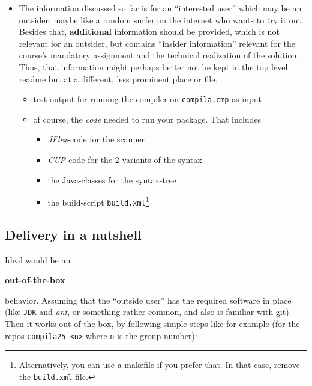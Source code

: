\documentclass[10pt,freeform]{handout}[2014/08/13]
\begin{document}
\begin{itemize}
\item The information discussed so far is for an ``interested user'' which
  may be an outsider, maybe like a random surfer on the internet who wants
  to try it out. Besides that, \textbf{additional} information should be
  provided, which is not relevant for an outsider, but contains ``insider
  information'' relevant for the course's mandatory assignment and the
  technical realization of the solution. Thus, that information might
  perhaps better not be kept in the top level readme but at a different,
  less prominent place or file.
  \begin{itemize}
  \item test-output for running the compiler on \texttt{compila.cmp} as
    input
  \item of course, the \emph{code} needed to run your package. That
    includes
    \begin{itemize}
    \item \textsl{JFlex}-code for the scanner
    \item \textsl{CUP}-code for the 2 variants of the syntax
    \item the Java-classes for the syntax-tree
    \item the build-script \texttt{build.xml}\footnote{Alternatively, you
        can use a makefile if you prefer that. In that case, remove the
        \texttt{build.xml}-file.}
    \end{itemize}
  \end{itemize}
\end{itemize}



\subsection{Delivery in a nutshell}
\label{sec:delivery-nutshell}


Ideal would be an 
\begin{center}
  \textbf{out-of-the-box}
\end{center}
behavior. Assuming that the ``outside user'' has the required software in
place (like \texttt{JDK} and \emph{ant}, or something rather common, and
also is familiar with git). Then it works out-of-the-box, by following
simple steps like for example (for the repos \texttt{compila25-<n>} where
\texttt{n} is the group number):
\end{document}
